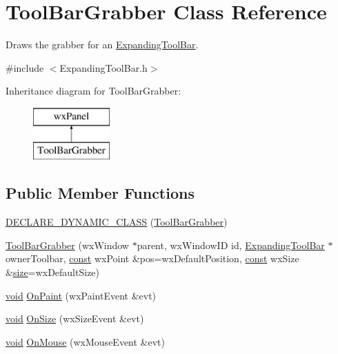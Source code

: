 \hypertarget{class_tool_bar_grabber}{}\section{Tool\+Bar\+Grabber Class Reference}
\label{class_tool_bar_grabber}


Draws the grabber for an \hyperlink{class_expanding_tool_bar}{Expanding\+Tool\+Bar}.  




{\ttfamily \#include $<$Expanding\+Tool\+Bar.\+h$>$}

Inheritance diagram for Tool\+Bar\+Grabber\+:\begin{figure}[H]
\begin{center}
\leavevmode
\includegraphics[height=2.000000cm]{class_tool_bar_grabber}
\end{center}
\end{figure}
\subsection*{Public Member Functions}
\begin{DoxyCompactItemize}
\item 
\hyperlink{class_tool_bar_grabber_adc3754c8021197d924fce959ee133895}{D\+E\+C\+L\+A\+R\+E\+\_\+\+D\+Y\+N\+A\+M\+I\+C\+\_\+\+C\+L\+A\+SS} (\hyperlink{class_tool_bar_grabber}{Tool\+Bar\+Grabber})
\item 
\hyperlink{class_tool_bar_grabber_a2a276a34b538ea459790fa757c6424c1}{Tool\+Bar\+Grabber} (wx\+Window $\ast$parent, wx\+Window\+ID id, \hyperlink{class_expanding_tool_bar}{Expanding\+Tool\+Bar} $\ast$owner\+Toolbar, \hyperlink{getopt1_8c_a2c212835823e3c54a8ab6d95c652660e}{const} wx\+Point \&pos=wx\+Default\+Position, \hyperlink{getopt1_8c_a2c212835823e3c54a8ab6d95c652660e}{const} wx\+Size \&\hyperlink{group__lavu__mem_ga854352f53b148adc24983a58a1866d66}{size}=wx\+Default\+Size)
\item 
\hyperlink{sound_8c_ae35f5844602719cf66324f4de2a658b3}{void} \hyperlink{class_tool_bar_grabber_a7aa27570faa8bc5cdd2e8b0990993aa4}{On\+Paint} (wx\+Paint\+Event \&evt)
\item 
\hyperlink{sound_8c_ae35f5844602719cf66324f4de2a658b3}{void} \hyperlink{class_tool_bar_grabber_abbeed33e8faf0651a0d68ee3969e32bd}{On\+Size} (wx\+Size\+Event \&evt)
\item 
\hyperlink{sound_8c_ae35f5844602719cf66324f4de2a658b3}{void} \hyperlink{class_tool_bar_grabber_abd30a85f8016a08c49b2c73e3337d340}{On\+Mouse} (wx\+Mouse\+Event \&evt)
\end{DoxyCompactItemize}
